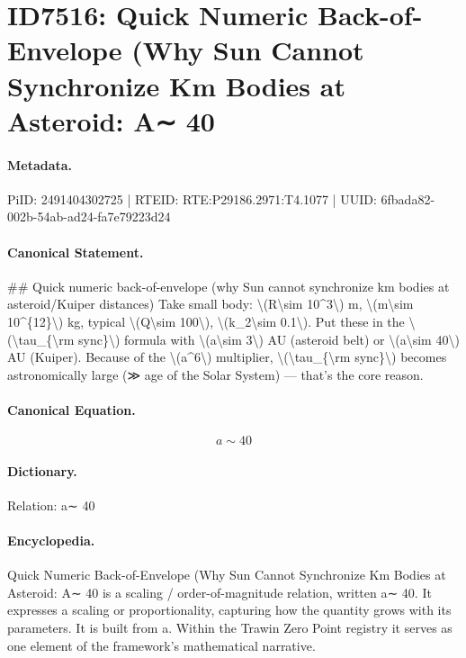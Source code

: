 \section*{ID7516: Quick Numeric Back-of-Envelope (Why Sun Cannot Synchronize Km Bodies at Asteroid: A∼ 40}
\paragraph{Metadata.}
PiID: 2491404302725 | RTEID: RTE:P29186.2971:T4.1077 | UUID: 6fbada82-002b-54ab-ad24-fa7e79223d24

\paragraph{Canonical Statement.}
\#\# Quick numeric back-of-envelope (why Sun cannot synchronize km bodies at asteroid/Kuiper distances) Take small body: \textbackslash{}(R\textbackslash{}sim 10\textasciicircum{}3\textbackslash{}) m, \textbackslash{}(m\textbackslash{}sim 10\textasciicircum{}\{12\}\textbackslash{}) kg, typical \textbackslash{}(Q\textbackslash{}sim 100\textbackslash{}), \textbackslash{}(k\_2\textbackslash{}sim 0.1\textbackslash{}). Put these in the \textbackslash{}(\textbackslash{}tau\_\{\textbackslash{}rm sync\}\textbackslash{}) formula with \textbackslash{}(a\textbackslash{}sim 3\textbackslash{}) AU (asteroid belt) or \textbackslash{}(a\textbackslash{}sim 40\textbackslash{}) AU (Kuiper). Because of the \textbackslash{}(a\textasciicircum{}6\textbackslash{}) multiplier, \textbackslash{}(\textbackslash{}tau\_\{\textbackslash{}rm sync\}\textbackslash{}) becomes astronomically large (≫ age of the Solar System) — that’s the core reason.

\paragraph{Canonical Equation.}
\[
a\sim 40
\]

\paragraph{Dictionary.}
Relation: a∼ 40

\paragraph{Encyclopedia.}
Quick Numeric Back-of-Envelope (Why Sun Cannot Synchronize Km Bodies at Asteroid: A∼ 40 is a scaling / order-of-magnitude relation, written a∼ 40. It expresses a scaling or proportionality, capturing how the quantity grows with its parameters. It is built from a. Within the Trawin Zero Point registry it serves as one element of the framework's mathematical narrative.
